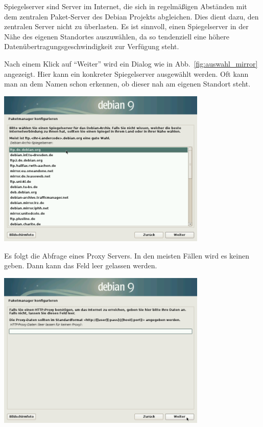 \documentclass[a4paper,12pt,twoside]{article}
\begin{document}
Spiegelserver sind Server im Internet, die sich in regelmäßigen
Abständen mit dem zentralen Paket-Server des Debian Projekts
abgleichen. Dies dient dazu, den zentralen Server nicht zu überlasten.
Es ist sinnvoll, einen Spiegelserver in der Nähe des eigenen Standortes
auszuwählen, da so tendenziell eine höhere
Datenübertragungsgeschwindigkeit zur Verfügung steht.

Nach einem Klick auf "`Weiter"' wird
ein Dialog wie in Abb.~\ref{fig:auswahl_mirror} angezeigt. Hier kann ein
konkreter Spiegelserver ausgewählt werden. Oft kann man an dem Namen
schon erkennen, ob dieser nah am eigenen Standort steht.

\begin{minipage}{\linewidth}
    \centering
    \captionsetup{type=figure}
    \includegraphics[width=10cm]{screenshots/select_mirror.png}
    \label{fig:auswahl_mirror}
\end{minipage}
 
Es folgt die Abfrage eines Proxy Servers. In den meisten Fällen wird es
keinen geben. Dann kann das Feld leer gelassen werden.

\begin{minipage}{\linewidth}
    \centering
    \captionsetup{type=figure}
    \includegraphics[width=10cm]{screenshots/set_mirror_proxy.png}
    \label{fig:auswahl_proxy}
\end{minipage}
\end{document}
